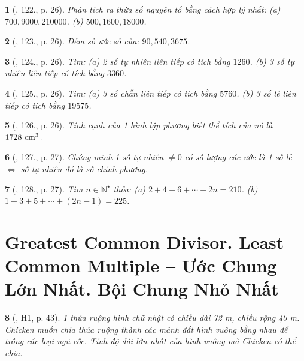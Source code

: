 \documentclass{article}
\newtheorem{baitoan}{}
\begin{document}
\begin{baitoan}[\cite{Tuyen_Toan_6}, 122., p. 26]
	Phân tích ra thừa số nguyên tố bằng cách hợp lý nhất: (a) $700,9000,210000$. (b) $500,1600,18000$.
\end{baitoan}

\begin{baitoan}[\cite{Tuyen_Toan_6}, 123., p. 26]
	Đếm số ước số của: $90,540,3675$.
\end{baitoan}

\begin{baitoan}[\cite{Tuyen_Toan_6}, 124., p. 26]
	Tìm: (a) 2 số tự nhiên liên tiếp có tích bằng $1260$. (b) 3 số tự nhiên liên tiếp có tích bằng $3360$.
\end{baitoan}

\begin{baitoan}[\cite{Tuyen_Toan_6}, 125., p. 26]
	Tìm: (a) 3 số chẵn liên tiếp có tích bằng $5760$. (b) 3 số lẻ liên tiếp có tích bằng $19575$.
\end{baitoan}

\begin{baitoan}[\cite{Tuyen_Toan_6}, 126., p. 26]
	Tính cạnh của 1 hình lập phương biết thể tích của nó là $\rm1728\ cm^3$.
\end{baitoan}

\begin{baitoan}[\cite{Tuyen_Toan_6}, 127., p. 27]
	Chứng minh 1 số tự nhiên $\ne0$ có số lượng các ước là 1 số lẻ $\Leftrightarrow$ số tự nhiên đó là số chính phương.
\end{baitoan}

\begin{baitoan}[\cite{Tuyen_Toan_6}, 128., p. 27]
	Tìm $n\in\mathbb{N}^\star$ thỏa: (a) $2 + 4 + 6 + \cdots + 2n = 210$. (b) $1 + 3 + 5 + \cdots + (2n - 1) = 225$.
\end{baitoan}


\section{Greatest Common Divisor. Least Common Multiple -- Ước Chung Lớn Nhất. Bội Chung Nhỏ Nhất}

\begin{baitoan}[\cite{Binh_boi_duong_Toan_6_tap_1}, H1, p. 43]
	1 thửa ruộng hình chữ nhật có chiều dài {\rm72 m}, chiều rộng {\rm40 m}. Chicken muốn chia thửa ruộng thành các mảnh đất hình vuông bằng nhau để trồng các loại ngũ cốc. Tính độ dài lớn nhất của hình vuông mà Chicken có thể chia.
\end{baitoan}
\end{document}
